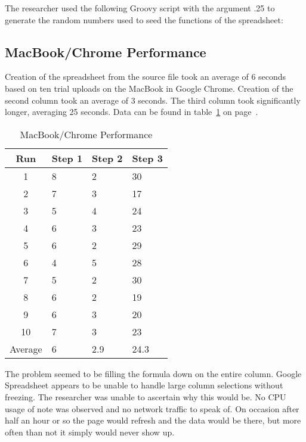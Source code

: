 The researcher used the following Groovy script with the argument .25 to
generate the random numbers used to seed the functions of the spreadsheet:



\subsection{MacBook/Chrome Performance}

Creation of the spreadsheet from the source file took an average of 6 seconds
based on ten trial uploads on the MacBook in Google Chrome. Creation of the
second column took an average of 3 seconds. The third column took significantly
longer, averaging 25 seconds. Data can be found in table~\ref{mbChromePerf} on
page~\pageref{mbChromePerf}.

\begin{table}
  \begin{tabular}{| c | l | l | l |}
    \hline
    Run      & Step 1 & Step 2 & Step 3 \\ \hline
    1        & 8      & 2      & 30     \\ \hline
    2        & 7      & 3      & 17     \\ \hline
    3        & 5      & 4      & 24     \\ \hline
    4        & 6      & 3      & 23     \\ \hline
    5        & 6      & 2      & 29     \\ \hline
    6        & 4      & 5      & 28     \\ \hline
    7        & 5      & 2      & 30     \\ \hline
    8        & 6      & 2      & 19     \\ \hline
    9        & 6      & 3      & 20     \\ \hline
    10       & 7      & 3      & 23     \\ \hline
    Average  & 6      & 2.9    & 24.3   \\
    \hline
  \end{tabular}
  \caption{MacBook/Chrome Performance}
  \label{mbChromePerf}
\end{table}

The problem seemed to be filling the formula down on the entire column.  Google
Spreadsheet appears to be unable to handle large column selections without
freezing.  The researcher was unable to ascertain why this would be.  No CPU
usage of note was observed and no network traffic to speak of.  On occasion
after half an hour or so the page would refresh and the data would be there, but
more often than not it simply would never show up.

